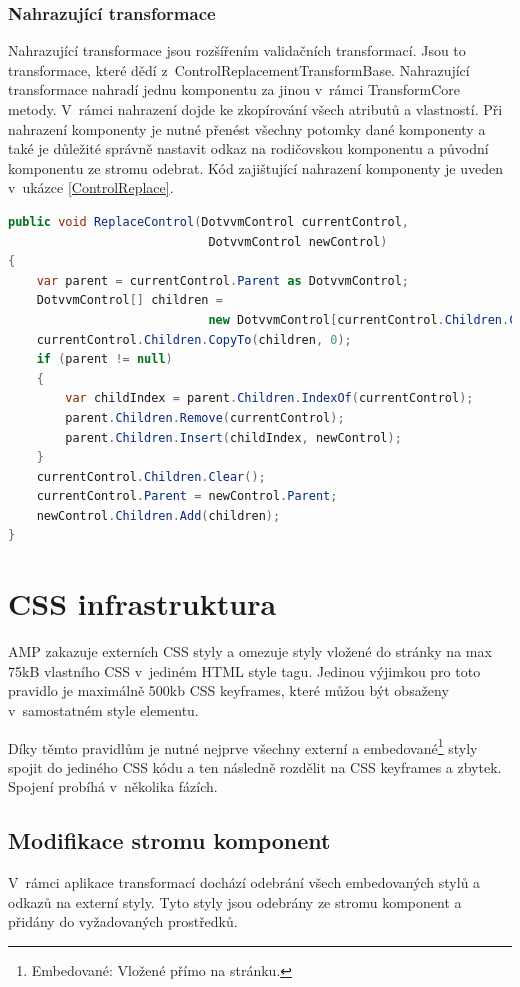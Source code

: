 \subsubsection{Nahrazující transformace}
    Nahrazující transformace jsou rozšířením validačních transformací. Jsou to transformace, které dědí z~ControlReplacementTransformBase. Nahrazující transformace nahradí jednu komponentu za jinou v~rámci TransformCore metody. V~rámci nahrazení dojde ke zkopírování všech atributů a vlastností. Při nahrazení komponenty je nutné přenést všechny potomky dané komponenty a také je důležité správně nastavit odkaz na rodičovskou komponentu a původní komponentu ze stromu odebrat. Kód zajištující nahrazení komponenty je uveden v~ukázce \ref{ControlReplace}.
    \pagebreak
    \begin{lstlisting}[language=c#, caption= Nahrazení jedné DotVVM komponenty za jinou. ,label=ControlReplace,captionpos=t]
public void ReplaceControl(DotvvmControl currentControl,
                            DotvvmControl newControl)
{
    var parent = currentControl.Parent as DotvvmControl;
    DotvvmControl[] children =
                            new DotvvmControl[currentControl.Children.Count];
    currentControl.Children.CopyTo(children, 0);
    if (parent != null)
    {
        var childIndex = parent.Children.IndexOf(currentControl);
        parent.Children.Remove(currentControl);
        parent.Children.Insert(childIndex, newControl);
    }
    currentControl.Children.Clear();
    currentControl.Parent = newControl.Parent;
    newControl.Children.Add(children);
}

\end{lstlisting}

\section{CSS infrastruktura}
AMP zakazuje externích CSS styly a omezuje styly vložené do stránky na max 75kB vlastního CSS v~jediném HTML style tagu. Jedinou výjimkou pro toto pravidlo je maximálně 500kb CSS keyframes, které můžou být obsaženy v~samostatném style elementu.

Díky těmto pravidlům je nutné nejprve všechny externí a embedované\footnote{Embedované: Vložené přímo na stránku.} styly spojit do jediného CSS kódu a ten následně rozdělit na CSS keyframes a zbytek. Spojení probíhá v~několika fázích.
\subsection*{Modifikace stromu komponent}
V~rámci aplikace transformací dochází odebrání všech embedovaných stylů a odkazů na externí styly. Tyto styly jsou odebrány ze stromu komponent a přidány do vyžadovaných prostředků.


